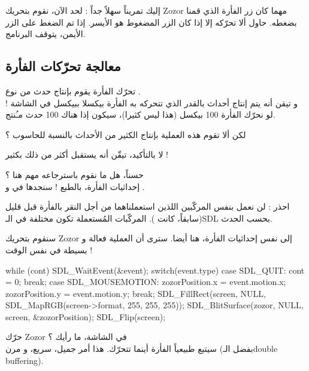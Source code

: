 
إليك تمريناً سهلاً جداً : لحد الآن، نقوم بتحريك
\textenglish{Zozor}
مهما كان زر الفأرة الذي قمنا بضغطه. حاول ألا تحرّكه إلا إذا كان الزر المضغوط هو الأيسر. إذا تم الضغط على الزر الأيمن، يتوقف البرنامج.

\subsection{معالجة تحرّكات الفأرة}

تحرّك الفأرة يقوم بإنتاج حدث من نوع
.\\
و تيقن أنه يتم إنتاج أحداث بالقدر الذي تتحركه به الفأرة بيكسلا ببيكسل في الشاشة ! لو نحرّك الفأرة 100 بيكسل (هذا ليس كثيرا)، سيكون إذا هناك 100 حدث مـُنتج.

\begin{question}
لكن ألا تقوم هذه العملية بإنتاج الكثير من الأحداث بالنسبة للحاسوب ؟
\end{question}

لا بالتأكيد، تيقّن أنه يستقبل أكثر من ذلك بكثير !

حسناً، هل ما نقوم باسترجاعه مهم هنا ؟\\
إحداثيات الفأرة، بالطبع ! سنجدها في
و
.

\begin{warning}
احذر : لن نعمل بنفس المركّبين اللذين استعملناهما من أجل النقر بالفأرة قبل قليل (سابقاً، كانت
).
المركّبات المُستعملة تكون مختلفة في الـ\textenglish{SDL}
بحسب الحدث.
\end{warning}

سنقوم بتحريك
\textenglish{Zozor}
إلى نفس إحداثيات الفأرة، هنا أيضا. سترى أن العملية فعالة و بسيطة في نفس الوقت !

\begin{Csource}
while (cont)
{
	SDL_WaitEvent(&event);
	switch(event.type)
	{
		case SDL_QUIT:
		cont = 0;
		break;
		case SDL_MOUSEMOTION:
		zozorPosition.x = event.motion.x;
		zozorPosition.y = event.motion.y;
		break;
	}
	SDL_FillRect(screen, NULL, SDL_MapRGB(screen->format, 255, 255, 255));
	SDL_BlitSurface(zozor, NULL, screen, &zozorPosition); 
	SDL_Flip(screen);
}
\end{Csource}

حرّك
\textenglish{Zozor}
في الشاشة، ما رأيك ؟\\
سيتبع طبيعياً الفأرة أينما تتحرّك. هذا أمر جميل، سريع، و مرن (بفضل الـ\textenglish{double buffering}).

